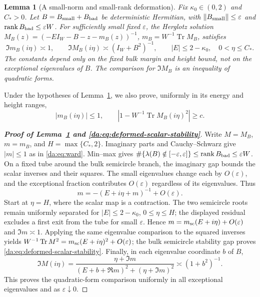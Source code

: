 \documentclass[11pt]{article}
\numberwithin{equation}{section}
\newtheorem{lemma}[theorem]{Lemma}
\theoremstyle{remark}
\newcommand{\Tr}{\operatorname{Tr}}
\newcommand{\rank}{\operatorname{rank}}
\begin{document}
\begin{lemma}[A small-norm and small-rank deformation]\label{da:lem:deformed}
Fix $\kappa_0\in(0,2)$ and $C_*>0$. Let
$B=B_{\rm small}+B_{\rm bad}$ be deterministic Hermitian, with
$\|B_{\rm small}\|\le\varepsilon$ and $\rank B_{\rm bad}\le\varepsilon W$.
For sufficiently small fixed $\varepsilon$, the Herglotz solution
$M_B(z)=(-EI_W-B-z-m_B(z))^{-1}$, $m_B=W^{-1}\Tr M_B$, satisfies
\begin{equation}\label{us:eq:deformed-profile}
 \Im m_B(i\eta)\asymp1,\qquad
 \Im M_B(i\eta)\asymp(I_W+B^2)^{-1},\qquad
 |E|\le2-\kappa_0,\quad 0<\eta\le C_*.
\end{equation}
The constants depend only on the fixed bulk margin and height bound,
not on the exceptional eigenvalues of $B$. 
The comparison for $\Im M_B$ is an inequality of quadratic forms.
\end{lemma}

Under the hypotheses of Lemma~\ref{da:lem:deformed}, we also prove,
uniformly in its energy and height ranges,
\begin{equation}\label{da:eq:deformed-scalar-stability}
 |m_B(i\eta)|\le1,\qquad
 \left|1-W^{-1}\Tr M_B(i\eta)^2\right|\ge c.
\end{equation}

\begin{proof}[\textbf{Proof of Lemma~\ref{da:lem:deformed} and \eqref{da:eq:deformed-scalar-stability}}]
Write $M=M_B$, $m=m_B$, and $H=\max\{C_*,2\}$.
Imaginary parts and Cauchy--Schwarz give $|m|\le1$ as in
\eqref{da:eq:ward}. Min--max gives
$\#\{\lambda(B)\notin[-\varepsilon,\varepsilon]\}
\le\operatorname{rank}B_{\rm bad}\le\varepsilon W$.
On a fixed tube around the bulk semicircle branch, the imaginary gap
bounds the scalar inverses and their squares. The small eigenvalues
change each by $O(\varepsilon)$, and the exceptional fraction contributes
$O(\varepsilon)$ regardless of its eigenvalues. Thus
\[
 m=-(E+i\eta+m)^{-1}+O(\varepsilon).
\]
Start at $\eta=H$, where the scalar map is a contraction. The two
semicircle roots remain uniformly separated for
$|E|\le2-\kappa_0$, $0\le\eta\le H$; the displayed residual excludes
a first exit from the tube for small $\varepsilon$. Hence
$m=m_{\rm sc}(E+i\eta)+O(\varepsilon)$ and $\Im m\asymp1$.
Applying the same eigenvalue comparison to the squared inverses yields
$W^{-1}\Tr M^2=m_{\rm sc}(E+i\eta)^2+O(\varepsilon)$;
the bulk semicircle stability gap proves
\eqref{da:eq:deformed-scalar-stability}.
Finally, in each eigenvalue coordinate $b$ of $B$,
\[
 \Im M(i\eta)=\frac{\eta+\Im m}
 {(E+b+\Re m)^2+(\eta+\Im m)^2}\asymp(1+b^2)^{-1}.
\]
This proves the quadratic-form comparison uniformly in all exceptional
eigenvalues and as $\varepsilon\downarrow0$.
\end{proof}
\end{document}
